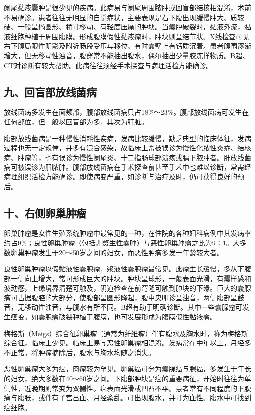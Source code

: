 阑尾黏液囊肿是很少见的疾病。此病易与阑尾周围脓肿或回盲部结核相混淆，术前不易确诊。患者往往无明显的自觉症状，主要表现是右下腹出现缓慢肿大、质较硬、一般呈椭圆形、稍可移动、有轻度压痛的肿块。当囊肿破裂时，黏液外流，黏液细胞种植于周围腹膜。形成腹膜假性黏液瘤时，肿块则呈结节状。X线检查可见右下腹局限性阴影及附近肠段受压与移位，有时囊壁上有钙质沉着。患者腹围逐渐增大，但无移动性浊音，腹穿常不能抽出腹水，偶尔抽出少量胶冻样物质。B超、CT对诊断有较大帮助。此病往往须经手术探查与病理活检方能确诊。

\subsection{九、回盲部放线菌病}

放线菌病多发生在面颊部，腹部放线菌病只占18\%～23\%。腹部放线菌病可发生在任何部位，但一般以回盲部为多，其次为肝脏。

腹部放线菌病是一种慢性消耗性疾病，发病比较缓慢，缺乏典型的临床体征，发病过程也无一定规律，并多有混合感染，故临床上常被误诊为慢性化脓性炎症、结核病、肿瘤等，也有误诊为慢性阑尾炎、十二指肠球部溃疡或膈下脓肿者。肝放线菌病可被误诊为肝脓肿。腹部放线菌病在手术探查前甚至手术中也难以诊断，常需经病理组织活检方能确诊。即使病变严重，如诊断与治疗及时，仍可获得良好的预后。

\subsection{十、右侧卵巢肿瘤}

卵巢肿瘤是女性生殖系统肿瘤中最常见的一种，在住院的各种妇科病例中其发病率约占9\%；良性卵巢肿瘤（包括非赘生性囊肿）与恶性卵巢肿瘤之比为9∶1。大多数卵巢肿瘤发生于20～50岁之间的妇女，而恶性肿瘤多发于年龄较大者。

良性卵巢肿瘤以假黏液性囊腺瘤，浆液性囊腺瘤最常见。此瘤生长缓慢，多从下腹部一侧向上增大，常可形成巨大的肿块。肿块呈球形，一般表面光滑，有囊样感和波动感，上缘境界清楚可触及，阴道检查在前穹隆可触到肿块的下缘。巨大的囊腺瘤可占据腹腔的大部分，使腹部呈圆形隆起，腹中央叩诊呈浊音，两侧腹部呈鼓音，无移动性浊音，与腹水有所不同。B超有助于明确诊断。其中一些囊腺瘤可发生癌变。如囊腺瘤破裂种植于腹膜，也可发展形成为腹膜假性黏液瘤。

梅格斯（Meigs）综合征卵巢瘤（通常为纤维瘤）伴有腹水及胸水时，称为梅格斯综合征，临床上少见。临床上易与恶性卵巢瘤相混淆。发病常在中年以上，月经多不正常。将肿瘤摘除后，腹水与胸水均随之消失。

恶性卵巢瘤大多为癌，肉瘤较为罕见。卵巢癌可分为囊腺癌与腺癌，多发生于年长的妇女，绝大多数在40～60岁之间。下腹部肿块是癌的重要病征，开始时往往为单侧性，近晚期则常变为双侧性。癌表面光滑或凹凸不平。患者常有不同程度的下腹痛与腹胀，或伴有子宫出血、月经紊乱。可出现腹水，并可为血性。腹水中可找到癌细胞。

